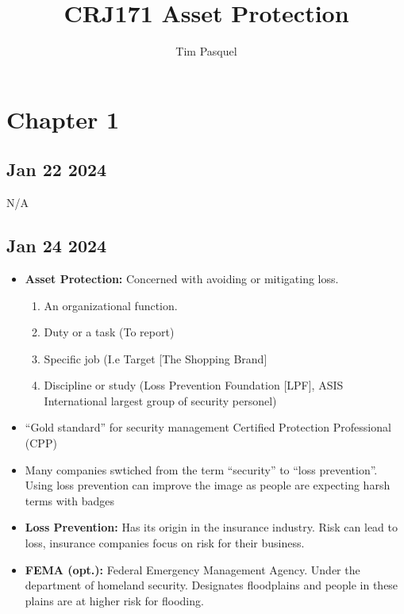 \documentclass[12pt]{article}
\author{Tim Pasquel}
\title{CRJ171 Asset Protection}
\begin{document}
\maketitle

\titlepage

\section*{Chapter 1}

\subsection*{Jan 22 2024}

N/A

\subsection*{Jan 24 2024}

\begin{itemize}
		  \item \textbf{Asset Protection:} Concerned with avoiding or mitigating loss. 
					 \begin{enumerate}
					 		\item An organizational function.
							\item Duty or a task (To report)
							\item Specific job (I.e Target [The Shopping Brand]
							\item Discipline or study (Loss Prevention Foundation [LPF],
									  ASIS International largest group of security personel)

					 \end{enumerate}
		  \item ``Gold standard'' for security management Certified Protection Professional
					(CPP)
		  \item Many companies swtiched from the term ``security'' to ``loss prevention''. Using
					 loss prevention can improve the image as people are expecting harsh terms with badges
		  \item \textbf{Loss Prevention:} Has its origin in the insurance industry. 
					 Risk can lead to loss, insurance companies focus on risk for their business.
		  \item \textbf{FEMA (opt.):} Federal Emergency Management Agency. Under the department of
					 homeland security. Designates floodplains and people in these plains are
					 at higher risk for flooding. 
\end{itemize}
\end{document}
